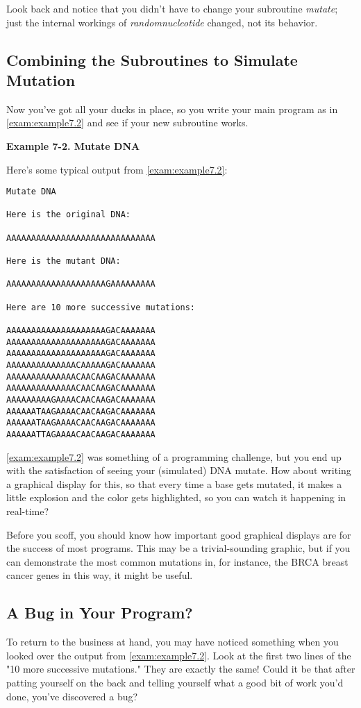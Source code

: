 Look back and notice that you didn't have to change your subroutine \textit{mutate}; just the internal workings of \textit{randomnucleotide} changed, not its behavior. 

\subsection{Combining the Subroutines to Simulate Mutation}
Now you've got all your ducks in place, so you write your main program as in \autoref{exam:example7.2} and see if your new subroutine works.

\textbf{Example 7-2. Mutate DNA}


Here's some typical output from \autoref{exam:example7.2}:

\begin{lstlisting}
Mutate DNA

Here is the original DNA:

AAAAAAAAAAAAAAAAAAAAAAAAAAAAAA

Here is the mutant DNA:

AAAAAAAAAAAAAAAAAAAAGAAAAAAAAA

Here are 10 more successive mutations:

AAAAAAAAAAAAAAAAAAAAGACAAAAAAA
AAAAAAAAAAAAAAAAAAAAGACAAAAAAA
AAAAAAAAAAAAAAAAAAAAGACAAAAAAA
AAAAAAAAAAAAAACAAAAAGACAAAAAAA
AAAAAAAAAAAAAACAACAAGACAAAAAAA
AAAAAAAAAAAAAACAACAAGACAAAAAAA
AAAAAAAAAGAAAACAACAAGACAAAAAAA
AAAAAATAAGAAAACAACAAGACAAAAAAA
AAAAAATAAGAAAACAACAAGACAAAAAAA
AAAAAATTAGAAAACAACAAGACAAAAAAA
\end{lstlisting}

\autoref{exam:example7.2} was something of a programming challenge, but you end up with the satisfaction of seeing your (simulated) DNA mutate. How about writing a graphical display for this, so that every time a base gets mutated, it makes a little explosion and the color gets highlighted, so you can watch it happening in real-time?

Before you scoff, you should know how important good graphical displays are for the success of most programs. This may be a trivial-sounding graphic, but if you can demonstrate the most common mutations in, for instance, the BRCA breast cancer genes in this way, it might be useful. 

\subsection{A Bug in Your Program?}
To return to the business at hand, you may have noticed something when you looked over the output from \autoref{exam:example7.2}. Look at the first two lines of the "10 more successive mutations." They are exactly the same! Could it be that after patting yourself on the back and telling yourself what a good bit of work you'd done, you've discovered a bug?

